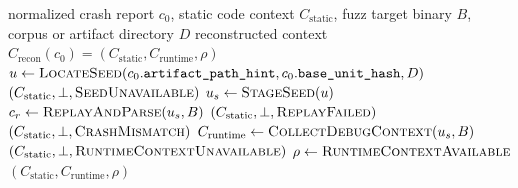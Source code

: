 \documentclass[pdflatex,sn-basic]{sn-jnl}%
\theoremstyle{thmstyleone}%
\theoremstyle{thmstyletwo}%
\theoremstyle{thmstylethree}%
\begin{document}
\begin{algorithm}[t]
\caption{Runtime Context Reconstruction}
\label{alg:runtime-context}
\begin{algorithmic}
\Require normalized crash report \(c_0\), static code context \(C_{\mathrm{static}}\), fuzz target binary \(B\), corpus or artifact directory \(D\)
\Ensure reconstructed context \(C_{\mathrm{recon}}(c_0)=(C_{\mathrm{static}}, C_{\mathrm{runtime}}, \rho)\)
\State \(u \gets \Call{LocateSeed}{c_0.\texttt{artifact\_path\_hint}, c_0.\texttt{base\_unit\_hash}, D}\)
    \State \Return \((C_{\mathrm{static}}, \bot, \textsc{SeedUnavailable})\)
\EndIf
\State \(u_s \gets \Call{StageSeed}{u}\)
\State \(c_r \gets \Call{ReplayAndParse}{u_s, B}\)
    \State \Return \((C_{\mathrm{static}}, \bot, \textsc{ReplayFailed})\)
\EndIf
{}
    \State \Return \((C_{\mathrm{static}}, \bot, \textsc{CrashMismatch})\)
\EndIf
\State \(C_{\mathrm{runtime}} \gets \Call{CollectDebugContext}{u_s, B}\)
    \State \Return \((C_{\mathrm{static}}, \bot, \textsc{RuntimeContextUnavailable})\)
\EndIf
\State \(\rho \gets \textsc{RuntimeContextAvailable}\)
\State \Return \((C_{\mathrm{static}}, C_{\mathrm{runtime}}, \rho)\)
\end{algorithmic}
\end{algorithm}
\end{document}
